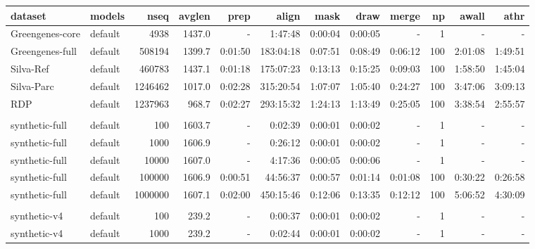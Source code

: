 \begin{table}
\begin{center}
  \scriptsize
  \begin{tabular}{llrr|rrrrr|rrr} \hline
dataset         & models   &    nseq & avglen &      prep &     align &      mask &      draw &     merge &  np &     awall &      athr \\ \hline
Greengenes-core & default  &    4938 & 1437.0 &         - &   1:47:48 &   0:00:04 &   0:00:05 &         - &   1 &         - &         - \\
Greengenes-full & default  &  508194 & 1399.7 &   0:01:50 & 183:04:18 &   0:07:51 &   0:08:49 &   0:06:12 & 100 &   2:01:08 &   1:49:51 \\
Silva-Ref       & default  &  460783 & 1437.1 &   0:01:18 & 175:07:23 &   0:13:13 &   0:15:25 &   0:09:03 & 100 &   1:58:50 &   1:45:04 \\
Silva-Parc      & default  & 1246462 & 1017.0 &   0:02:28 & 315:20:54 &   1:07:07 &   1:05:40 &   0:24:27 & 100 &   3:47:06 &   3:09:13 \\
RDP             & default  & 1237963 &  968.7 &   0:02:27 & 293:15:32 &   1:24:13 &   1:13:49 &   0:25:05 & 100 &   3:38:54 &   2:55:57 \\
& & & & & & & & & & \\
synthetic-full  & default  &     100 & 1603.7 &         - &   0:02:39 &   0:00:01 &   0:00:02 &         - &   1 &         - &         - \\
synthetic-full  & default  &    1000 & 1606.9 &         - &   0:26:12 &   0:00:01 &   0:00:02 &         - &   1 &         - &         - \\
synthetic-full  & default  &   10000 & 1607.0 &         - &   4:17:36 &   0:00:05 &   0:00:06 &         - &   1 &         - &         - \\
synthetic-full  & default  &  100000 & 1606.9 &   0:00:51 &  44:56:37 &   0:00:57 &   0:01:14 &   0:01:08 & 100 &   0:30:22 &   0:26:58 \\
synthetic-full  & default  & 1000000 & 1607.1 &   0:02:00 & 450:15:46 &   0:12:06 &   0:13:35 &   0:12:12 & 100 &   5:06:52 &   4:30:09 \\
& & & & & & & & & & \\
synthetic-v4    & default  &     100 &  239.2 &         - &   0:00:37 &   0:00:01 &   0:00:02 &         - &   1 &         - &         - \\
synthetic-v4    & default  &    1000 &  239.2 &         - &   0:02:44 &   0:00:01 &   0:00:02 &         - &   1 &         - &         - \\

\end{tabular}
\end{center}
\end{table}
